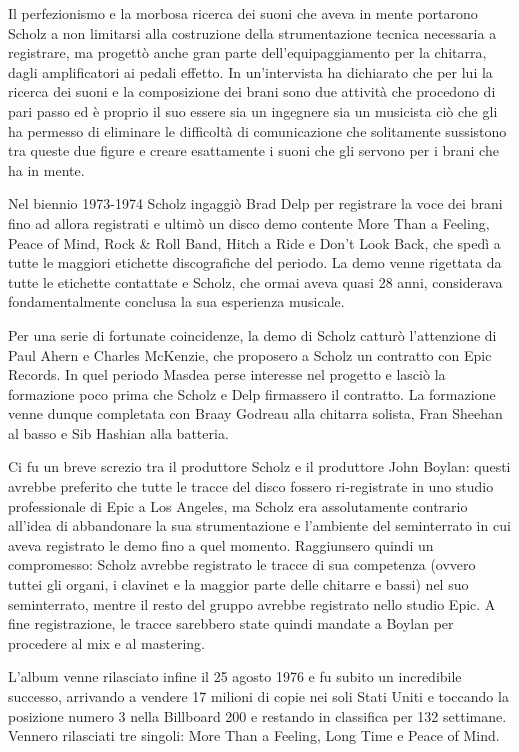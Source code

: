\documentclass[class=book, crop=false, oneside, 12pt]{standalone}
\begin{document}
Il perfezionismo e la morbosa ricerca dei suoni che aveva in mente portarono Scholz a non limitarsi alla costruzione della strumentazione tecnica necessaria a registrare, ma progettò anche gran parte dell'equipaggiamento per la chitarra, dagli amplificatori ai pedali effetto. In un'intervista ha dichiarato che per lui la ricerca dei suoni e la composizione dei brani sono due attività che procedono di pari passo ed è proprio il suo essere sia un ingegnere sia un musicista ciò che gli ha permesso di eliminare le difficoltà di comunicazione che solitamente sussistono tra queste due figure e creare esattamente i suoni che gli servono per i brani che ha in mente\cite{yt:scholz_sound}.

Nel biennio 1973-1974 Scholz ingaggiò Brad Delp per registrare la voce dei brani fino ad allora registrati e ultimò un disco demo contente More Than a Feeling, Peace of Mind, Rock \& Roll Band, Hitch a Ride e Don't Look Back, che spedì a tutte le maggiori etichette discografiche del periodo. La demo venne rigettata da tutte le etichette contattate e Scholz, che ormai aveva quasi 28 anni, considerava fondamentalmente conclusa la sua esperienza musicale.

Per una serie di fortunate coincidenze\cite{wiki:bost_a}, la demo di Scholz catturò l'attenzione di Paul Ahern e Charles McKenzie\cite{wiki:bost_b}, che proposero a Scholz un contratto con Epic Records. In quel periodo Masdea perse interesse nel progetto e lasciò la formazione poco prima che Scholz e Delp firmassero il contratto. La formazione venne dunque completata con Braay Godreau alla chitarra solista, Fran Sheehan al basso e Sib Hashian alla batteria.

Ci fu un breve screzio tra il produttore Scholz e il produttore John Boylan: questi avrebbe preferito che tutte le tracce del disco fossero ri-registrate in uno studio professionale di Epic a Los Angeles, ma Scholz era assolutamente contrario all'idea di abbandonare la sua strumentazione e l'ambiente del seminterrato in cui aveva registrato le demo fino a quel momento. Raggiunsero quindi un compromesso: Scholz avrebbe registrato le tracce di sua competenza (ovvero tuttei gli organi, i clavinet e la maggior parte delle chitarre e bassi) nel suo seminterrato, mentre il resto del gruppo avrebbe registrato nello studio Epic. A fine registrazione, le tracce sarebbero state quindi mandate a Boylan per procedere al mix e al mastering.

L'album venne rilasciato infine il 25 agosto 1976 e fu subito un incredibile successo, arrivando a vendere 17 milioni di copie nei soli Stati Uniti e toccando la posizione numero 3 nella Billboard 200 e restando in classifica per 132 settimane\cite{wiki:bost_b}. Vennero rilasciati tre singoli: More Than a Feeling, Long Time e Peace of Mind.
\end{document}
